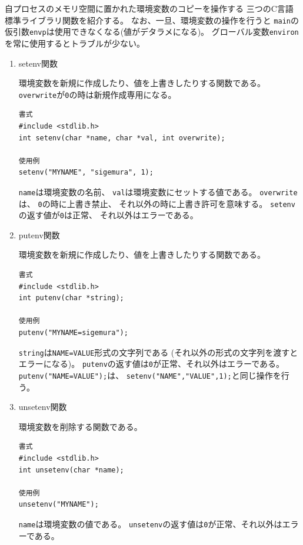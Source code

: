 \documentclass[a4j,dvipdfmx]{jarticle}
\begin{document}
\begin{enumerate}
自プロセスのメモリ空間に置かれた環境変数のコピーを操作する
三つのC言語標準ライブラリ関数を紹介する。
なお、一旦、環境変数の操作を行うと
\verb/main/の仮引数\verb/envp/は使用できなくなる(値がデタラメになる)。
グローバル変数\verb/environ/を常に使用するとトラブルが少ない。

\begin{enumerate}
\item setenv関数

環境変数を新規に作成したり、値を上書きしたりする関数である。
\verb/overwrite/が\verb/0/の時は新規作成専用になる。

\begin{lstlisting}[numbers=none]
書式
#include <stdlib.h>
int setenv(char *name, char *val, int overwrite);

使用例
setenv("MYNAME", "sigemura", 1);
\end{lstlisting}

\verb/name/は環境変数の名前、
\verb/val/は環境変数にセットする値である。
\verb/overwrite/は、
\verb/0/の時に上書き禁止、
それ以外の時に上書き許可を意味する。
\verb/setenv/の返す値が\verb/0/は正常、
それ以外はエラーである。

\item putenv関数

環境変数を新規に作成したり、値を上書きしたりする関数である。

\begin{lstlisting}[numbers=none]
書式
#include <stdlib.h>
int putenv(char *string);

使用例
putenv("MYNAME=sigemura");
\end{lstlisting}

\verb/string/は\verb/NAME=VALUE/形式の文字列である
(それ以外の形式の文字列を渡すとエラーになる)。
\verb/putenv/の返す値は\verb/0/が正常、それ以外はエラーである。
\verb/putenv("NAME=VALUE");/は、
\verb/setenv("NAME","VALUE",1);/と同じ操作を行う。

\item unsetenv関数

環境変数を削除する関数である。

\begin{lstlisting}[numbers=none]
書式
#include <stdlib.h>
int unsetenv(char *name);

使用例
unsetenv("MYNAME");
\end{lstlisting}

\verb/name/は環境変数の値である。
\verb/unsetenv/の返す値は\verb/0/が正常、それ以外はエラーである。


\end{enumerate}
\end{enumerate}
\end{document}
